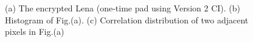 \begin{figure}
\caption{(a) The encrypted Lena (one-time pad using Version 2 CI). (b) Histogram of Fig.(a). (c) Correlation distribution of two adjacent pixels in Fig.(a)}
\label{New_CI}
\end{figure}
